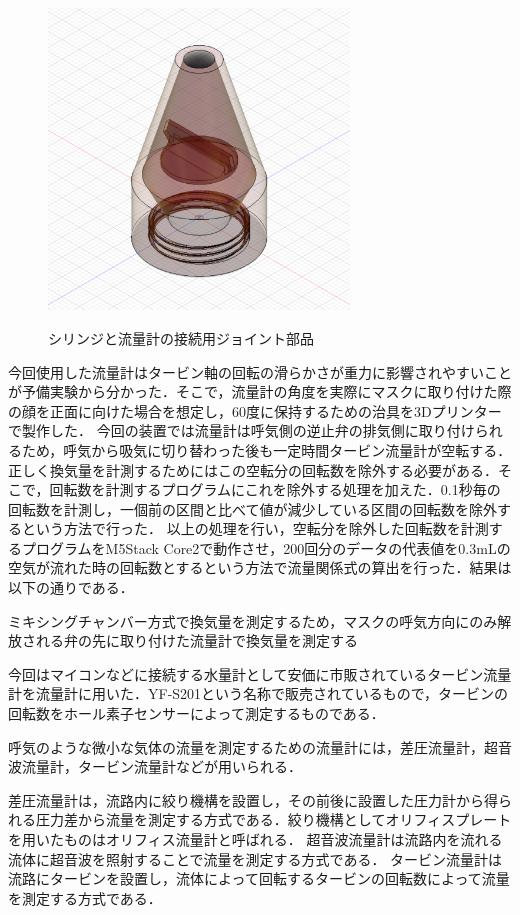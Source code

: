 \begin{figure}[h]
  \begin{center}
    \label{fig:syringe_cone}
    \includegraphics[width=8cm]{fig/syringe_cone}
    \caption{シリンジと流量計の接続用ジョイント部品}
  \end{center}
\end{figure}

今回使用した流量計はタービン軸の回転の滑らかさが重力に影響されやすいことが予備実験から分かった．そこで，流量計の角度を実際にマスクに取り付けた際の顔を正面に向けた場合を想定し，60度に保持するための治具を3Dプリンターで製作した．
今回の装置では流量計は呼気側の逆止弁の排気側に取り付けられるため，呼気から吸気に切り替わった後も一定時間タービン流量計が空転する．正しく換気量を計測するためにはこの空転分の回転数を除外する必要がある．そこで，回転数を計測するプログラムにこれを除外する処理を加えた．0.1秒毎の回転数を計測し，一個前の区間と比べて値が減少している区間の回転数を除外するという方法で行った．
以上の処理を行い，空転分を除外した回転数を計測するプログラムをM5Stack Core2で動作させ，200回分のデータの代表値を0.3mLの空気が流れた時の回転数とするという方法で流量関係式の算出を行った．結果は以下の通りである．

ミキシングチャンバー方式で換気量を測定するため，マスクの呼気方向にのみ解放される弁の先に取り付けた流量計で換気量を測定する

今回はマイコンなどに接続する水量計として安価に市販されているタービン流量計を流量計に用いた．YF-S201という名称で販売されているもので，タービンの回転数をホール素子センサーによって測定するものである．

呼気のような微小な気体の流量を測定するための流量計には，差圧流量計，超音波流量計，タービン流量計などが用いられる．

差圧流量計は，流路内に絞り機構を設置し，その前後に設置した圧力計から得られる圧力差から流量を測定する方式である．絞り機構としてオリフィスプレートを用いたものはオリフィス流量計と呼ばれる．
超音波流量計は流路内を流れる流体に超音波を照射することで流量を測定する方式である．
タービン流量計は流路にタービンを設置し，流体によって回転するタービンの回転数によって流量を測定する方式である．

